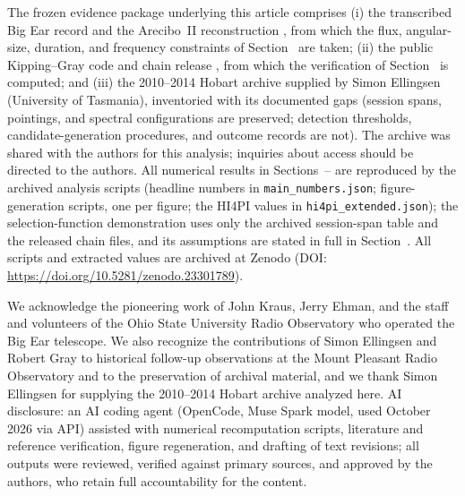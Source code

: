 \documentclass[twocolumn]{aastex701}
\begin{document}
The frozen evidence package underlying this article comprises (i) the transcribed Big Ear record and the Arecibo~II reconstruction \citep{mendez2025}, from which the flux, angular-size, duration, and frequency constraints of Section~ are taken; (ii) the public Kipping--Gray code and chain release \citep[\texttt{github.com/davidkipping/wow}]{kipping2022code}, from which the verification of Section~ is computed; and (iii) the 2010--2014 Hobart archive supplied by Simon Ellingsen (University of Tasmania), inventoried with its documented gaps (session spans, pointings, and spectral configurations are preserved; detection thresholds, candidate-generation procedures, and outcome records are not). The archive was shared with the authors for this analysis; inquiries about access should be directed to the authors.
All numerical results in Sections~-- are reproduced by the archived analysis scripts (headline numbers in \texttt{main\_numbers.json}; figure-generation scripts, one per figure; the HI4PI values in \texttt{hi4pi\_extended.json}); the selection-function demonstration uses only the archived session-span table and the released chain files, and its assumptions are stated in full in Section~. All scripts and extracted values are archived at Zenodo (DOI: \url{https://doi.org/10.5281/zenodo.23301789}).

\begin{acknowledgments}
We acknowledge the pioneering work of John Kraus, Jerry Ehman, and the staff and volunteers of the Ohio State University Radio Observatory who operated the Big Ear telescope. We also recognize the contributions of Simon Ellingsen and Robert Gray to historical follow-up observations at the Mount Pleasant Radio Observatory and to the preservation of archival material, and we thank Simon Ellingsen for supplying the 2010--2014 Hobart archive analyzed here.
AI disclosure: an AI coding agent (OpenCode, Muse Spark model, used October 2026 via API) assisted with numerical recomputation scripts, literature and reference verification, figure regeneration, and drafting of text revisions; all outputs were reviewed, verified against primary sources, and approved by the authors, who retain full accountability for the content.
\end{acknowledgments}





\end{document}
